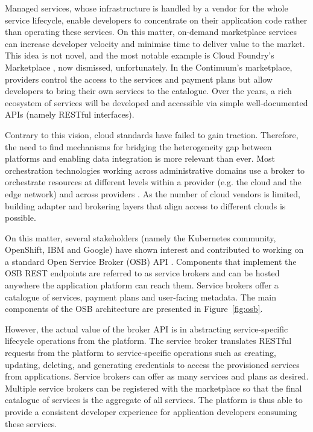 Managed services, whose infrastructure is handled by a vendor for the whole service lifecycle, enable developers to concentrate on their application code rather than operating these services. On this matter, on-demand marketplace services can increase developer velocity and minimise time to deliver value to the market. This idea is not novel, and the most notable example is Cloud Foundry's Marketplace \cite{cloud-foundry-marketplace}, now dismissed, unfortunately. In the Continuum's marketplace, providers control the access to the services and payment plans but allow developers to bring their own services to the catalogue. Over the years, a rich ecosystem of services will be developed and accessible via simple well-documented APIs (namely RESTful interfaces).

Contrary to this vision, cloud standards have failed to gain traction. Therefore, the need to find mechanisms for bridging the heterogeneity gap between platforms and enabling data integration is more relevant than ever. Most orchestration technologies working across administrative domains use a broker to orchestrate resources at different levels within a provider (e.g. the cloud and the edge network) and across providers \cite{grozev2014inter}. As the number of cloud vendors is limited, building adapter and brokering layers that align access to different clouds is possible. 

On this matter, several stakeholders (namely the Kubernetes community, OpenShift, IBM and Google) have shown interest and contributed to working on a standard Open Service Broker (OSB) API \cite{osb}. Components that implement the OSB REST endpoints are referred to as service brokers and can be hosted anywhere the application platform can reach them. Service brokers offer a catalogue of services, payment plans and user-facing metadata. The main components of the OSB architecture are presented in Figure~\ref{fig:osb}.

However, the actual value of the broker API is in abstracting service-specific lifecycle operations from the platform. The service broker translates RESTful requests from the platform to service-specific operations such as creating, updating, deleting, and generating credentials to access the provisioned services from applications. Service brokers can offer as many services and plans as desired. Multiple service brokers can be registered with the marketplace so that the final catalogue of services is the aggregate of all services. The platform is thus able to provide a consistent developer experience for application developers consuming these services.

